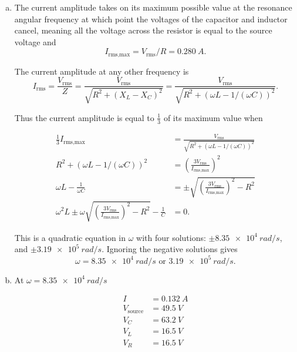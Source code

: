 \documentclass{article}
\begin{document}
\begin{enumerate}[(a)]
  \item The current amplitude takes on its maximum possible value at the resonance angular frequency at which point the voltages of the capacitor and inductor cancel, meaning all the voltage across the resistor is equal to the source voltage and \[I_\text{rms,max} = V_\text{rms} / R = \qty{0.280}{A}.\]

        The current amplitude at any other frequency is \[I_\text{rms} = \frac{V_\text{rms}}{Z} = \frac{V_\text{rms}}{\sqrt{R^2 + (X_L - X_C)^2}} = \frac{V_\text{rms}}{\sqrt{R^2 + (\omega L - 1 / (\omega C))^2}}.\]

        Thus the current amplitude is equal to $\frac{1}{3}$ of its maximum value when

        \begin{align*}
          \frac{1}{3} I_\text{rms,max}                                                                              & = \frac{V_\text{rms}}{\sqrt{R^2 + (\omega L - 1 / (\omega C))^2}}           \\
          R^2 + (\omega L - 1 / (\omega C))^2                                                                       & = \left( \frac{3 V_\text{rms}}{I_\text{rms,max}} \right)^2                  \\
          \omega L - \frac{1}{\omega C}                                                                             & = \pm \sqrt{\left( \frac{3 V_\text{rms}}{I_\text{rms,max}} \right)^2 - R^2} \\
          \omega^2 L \pm \omega \sqrt{\left( \frac{3 V_\text{rms}}{I_\text{rms,max}} \right)^2 - R^2} - \frac{1}{C} & = 0.
        \end{align*}

        This is a quadratic equation in $\omega$ with four solutions: $\pm \qty{8.35e4}{rad/s}$, and $\pm \qty{3.19e5}{rad/s}$. Ignoring the negative solutions gives \[\omega = \qty{8.35e4}{rad/s} \text{ or } \qty{3.19e5}{rad/s}.\]

  \item At $\omega = \qty{8.35e4}{rad/s}$

        \begin{align*}
          I               & = \qty{0.132}{A} \\
          V_\text{source} & = \qty{49.5}{V}  \\
          V_C             & = \qty{63.2}{V}  \\
          V_L             & = \qty{16.5}{V}  \\
          V_R             & = \qty{16.5}{V}
        \end{align*}


\end{enumerate}
\end{document}
